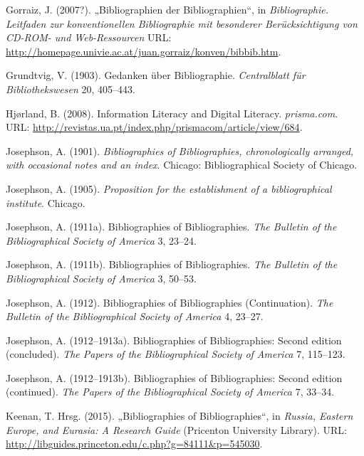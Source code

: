 \documentclass[a4paper,
fontsize=11pt,
oneside,
numbers=noperiodatend,
parskip=half-,
bibliography=totoc,
final
]{scrartcl}
\begin{document}
Gorraiz, J. (2007?). „Bibliographien der Bibliographien``, in
\emph{Bibliographie. Leitfaden zur konventionellen Bibliographie mit
besonderer Berücksichtigung von CD-ROM- und Web-Ressourcen} URL:
\url{http://homepage.univie.ac.at/juan.gorraiz/konven/bibbib.htm}.

Grundtvig, V. (1903). Gedanken über Bibliographie. \emph{Centralblatt
für Bibliothekswesen} 20, 405--443.

Hjørland, B. (2008). Information Literacy and Digital Literacy.
\emph{prisma.com}. URL:
\url{http://revistas.ua.pt/index.php/prismacom/article/view/684}.

Josephson, A. (1901). \emph{Bibliographies of Bibliographies,
chronologically arranged, with occasional notes and an index}. Chicago:
Bibliographical Society of Chicago.

Josephson, A. (1905). \emph{Proposition for the establishment of a
bibliographical institute}. Chicago.

Josephson, A. (1911a). Bibliographies of Bibliographies. \emph{The
Bulletin of the Bibliographical Society of America} 3, 23--24.

Josephson, A. (1911b). Bibliographies of Bibliographies. \emph{The
Bulletin of the Bibliographical Society of America} 3, 50--53.

Josephson, A. (1912). Bibliographies of Bibliographies (Continuation).
\emph{The Bulletin of the Bibliographical Society of America} 4, 23--27.

Josephson, A. (1912--1913a). Bibliographies of Bibliographies: Second
edition (concluded). \emph{The Papers of the Bibliographical Society of
America} 7, 115--123.

Josephson, A. (1912--1913b). Bibliographies of Bibliographies: Second
edition (continued). \emph{The Papers of the Bibliographical Society of
America} 7, 33--34.

Keenan, T. Hrsg. (2015). „Bibliographies of Bibliographies``, in
\emph{Russia, Eastern Europe, and Eurasia: A Research Guide} (Pricenton
University Library). URL:
\url{http://libguides.princeton.edu/c.php?g=84111\&p=545030}.
\end{document}

